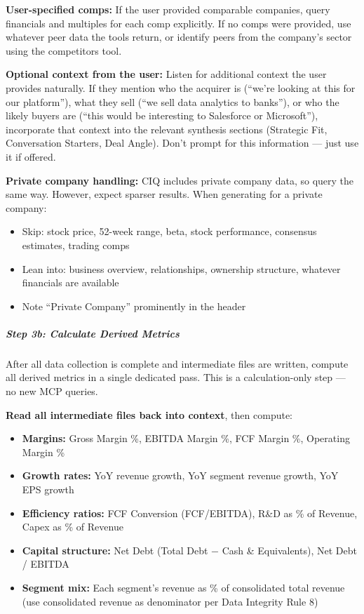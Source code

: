 \documentclass[11pt]{article}
\begin{document}
\textbf{User-specified comps:} If the user provided comparable companies, query financials and multiples for each comp explicitly. If no comps were provided, use whatever peer data the tools return, or identify peers from the company's sector using the competitors tool.


\textbf{Optional context from the user:} Listen for additional context the user provides naturally. If they mention who the acquirer is (``we're looking at this for our platform''), what they sell (``we sell data analytics to banks''), or who the likely buyers are (``this would be interesting to Salesforce or Microsoft''), incorporate that context into the relevant synthesis sections (Strategic Fit, Conversation Starters, Deal Angle). Don't prompt for this information — just use it if offered.


\textbf{Private company handling:} CIQ includes private company data, so query the same way. However, expect sparser results. When generating for a private company:

\begin{itemize}[leftmargin=*,itemsep=2pt,topsep=2pt]
\item {} Skip: stock price, 52-week range, beta, stock performance, consensus estimates, trading comps
\item {} Lean into: business overview, relationships, ownership structure, whatever financials are available
\item {} Note ``Private Company'' prominently in the header
\end{itemize}

\subparagraph{Step 3b: Calculate Derived Metrics}\mbox{}\par

After all data collection is complete and intermediate files are written, compute all derived metrics in a single dedicated pass. This is a calculation-only step — no new MCP queries.


\textbf{Read all intermediate files back into context}, then compute:


\begin{itemize}[leftmargin=*,itemsep=2pt,topsep=2pt]
\item {} \textbf{Margins:} Gross Margin \%, EBITDA Margin \%, FCF Margin \%, Operating Margin \%
\item {} \textbf{Growth rates:} YoY revenue growth, YoY segment revenue growth, YoY EPS growth
\item {} \textbf{Efficiency ratios:} FCF Conversion (FCF/EBITDA), R\&D as \% of Revenue, Capex as \% of Revenue
\item {} \textbf{Capital structure:} Net Debt (Total Debt − Cash \& Equivalents), Net Debt / EBITDA
\item {} \textbf{Segment mix:} Each segment's revenue as \% of consolidated total revenue (use consolidated revenue as denominator per Data Integrity Rule 8)
\end{itemize}
\end{document}
